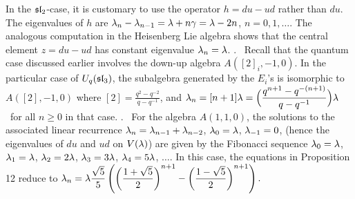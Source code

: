       In the $\frak s\frak l_2$-case, it is customary to use the operator $h = du-ud$  rather
      than $du$.  The eigenvalues of $h$ are $\lambda_n -\lambda_{n-1} = \lambda+n\gamma = \lambda-2n$,
      $n = 0,1, \dots$.  The analogous
      computation in the Heisenberg Lie algebra shows that the central element $z = du-ud$
      has  constant eigenvalue $\lambda_n = \lambda$. 
      \m
      . \   Recall that the quantum case discussed earlier involves
      the down-up algebra $A([2]_i,-1,0)$.   
      In the particular case of $U_q(\frak s\frak l_3)$, the subalgebra generated by
      the $E_i$'s is isomorphic to $A([2],-1,0)$ where $[2] = 
      \displaystyle{\frac{q^2-q^{-2}}{q-q^{-1}}}$, and 
      $\lambda_n = [n+1]\lambda = \Big(\displaystyle{\frac{q^{n+1}-q^{-(n+1)}}{q-q^{-1}}}
      \Big)\lambda$ \ for all $n \geq 0$ 
      in that case.  
      \m
      . \   For the algebra $A(1,1,0)$, 
       the solutions to the associated
      linear recurrence $\lambda_n = \lambda_{n-1} + \lambda_{n-2}$, $\lambda_0 = \lambda$, $\lambda_{-1} = 0$,
      (hence the eigenvalues of $du$ and $ud$ on $V(\lambda)$)   
      are given by the Fibonacci sequence
      $\lambda_0 = \lambda$, $\lambda_1 = \lambda$, $\lambda_2 = 2 \lambda$, $\lambda_3 = 3\lambda$, $\lambda_4 = 5 \lambda$,
      $\dots$.  In this case, the equations in Proposition 12 reduce to 
      $\displaystyle{\lambda_n = \lambda\frac {\sqrt 5}{5}\left( \left (\frac {1 + \sqrt 5}
      {2}\right)^{n+1} -\left(\frac {1 - \sqrt 5} {2}\right)^{n+1}\right).}$ 
       
